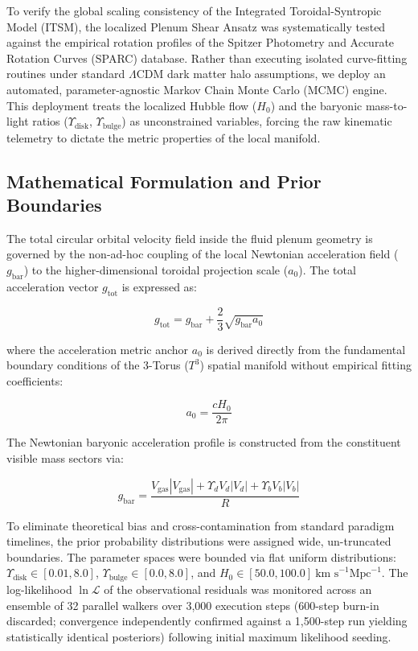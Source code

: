 \documentclass[aps,prd,10pt,twocolumn,superscriptaddress,nofootinbib,floatfix]{revtex4-2}
\begin{document}
To verify the global scaling consistency of the Integrated Toroidal-Syntropic Model (ITSM), the localized Plenum Shear Ansatz was systematically tested against the empirical rotation profiles of the Spitzer Photometry and Accurate Rotation Curves (SPARC) database. Rather than executing isolated curve-fitting routines under standard $\Lambda$CDM dark matter halo assumptions, we deploy an automated, parameter-agnostic Markov Chain Monte Carlo (MCMC) engine. This deployment treats the localized Hubble flow ($H_0$) and the baryonic mass-to-light ratios ($\Upsilon_{\text{disk}}$, $\Upsilon_{\text{bulge}}$) as unconstrained variables, forcing the raw kinematic telemetry to dictate the metric properties of the local manifold.

\subsection{Mathematical Formulation and Prior Boundaries}

The total circular orbital velocity field inside the fluid plenum geometry is governed by the non-ad-hoc coupling of the local Newtonian acceleration field ($g_{\text{bar}}$) to the higher-dimensional toroidal projection scale ($a_0$). The total acceleration vector $g_{\text{tot}}$ is expressed as:

\begin{equation}
g_{\text{tot}} = g_{\text{bar}} + \frac{2}{3}\sqrt{g_{\text{bar}} a_0}
\end{equation}

where the acceleration metric anchor $a_0$ is derived directly from the fundamental boundary conditions of the 3-Torus ($T^3$) spatial manifold without empirical fitting coefficients:

\begin{equation}
a_0 = \frac{c H_0}{2\pi}
\end{equation}

The Newtonian baryonic acceleration profile is constructed from the constituent visible mass sectors via:

\begin{equation}
g_{\text{bar}} = \frac{V_{\text{gas}}|V_{\text{gas}}| + \Upsilon_{d} V_{d}|V_{d}| + \Upsilon_{b} V_{b}|V_{b}|}{R}
\end{equation}

To eliminate theoretical bias and cross-contamination from standard paradigm timelines, the prior probability distributions were assigned wide, un-truncated boundaries. The parameter spaces were bounded via flat uniform distributions: $\Upsilon_{\text{disk}} \in [0.01, 8.0]$, $\Upsilon_{\text{bulge}} \in [0.0, 8.0]$, and $H_0 \in [50.0, 100.0] \ \text{km s}^{-1} \text{Mpc}^{-1}$. The log-likelihood $\ln \mathcal{L}$ of the observational residuals was monitored across an ensemble of 32 parallel walkers over 3,000 execution steps (600-step burn-in discarded; convergence independently confirmed against a 1,500-step run yielding statistically identical posteriors) following initial maximum likelihood seeding.
\end{document}
